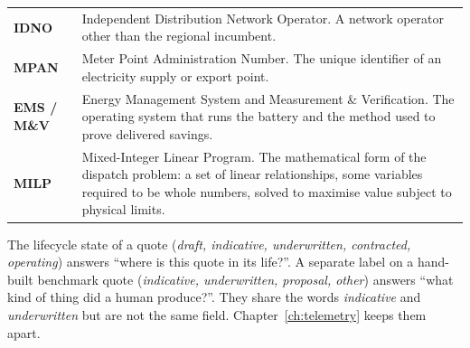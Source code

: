 \begin{longtable}{@{}>{\bfseries}p{2.4cm} p{12.3cm}@{}}
IDNO & Independent Distribution Network Operator. A network operator other than the regional incumbent. \\
MPAN & Meter Point Administration Number. The unique identifier of an electricity supply or export point. \\
EMS / M\&V & Energy Management System and Measurement \& Verification. The operating system that runs the battery and the method used to prove delivered savings. \\
MILP & Mixed-Integer Linear Program. The mathematical form of the dispatch problem: a set of linear relationships, some variables required to be whole numbers, solved to maximise value subject to physical limits. \\
\end{longtable}

\vspace{6pt}
\begin{caution}
The lifecycle state of a quote (\emph{draft, indicative, underwritten, contracted, operating}) answers ``where is this quote in its life?''. A separate label on a hand-built benchmark quote (\emph{indicative, underwritten, proposal, other}) answers ``what kind of thing did a human produce?''. They share the words \emph{indicative} and \emph{underwritten} but are not the same field. Chapter~\ref{ch:telemetry} keeps them apart.
\end{caution}
